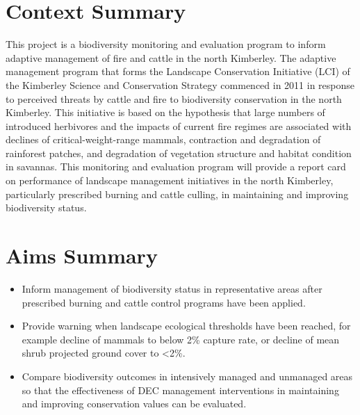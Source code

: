 \documentclass[version=last, paper=a4, DIV=18, usenames, dvipsnames]{scrartcl}
\begin{document}
\section{Context Summary}



This project is a biodiversity monitoring and evaluation program to inform adaptive management of fire and cattle in the north Kimberley. The adaptive management program that forms the Landscape Conservation Initiative (LCI) of the Kimberley Science and Conservation Strategy commenced in 2011 in response to perceived threats by cattle and fire to biodiversity conservation in the north Kimberley. This initiative is based on the hypothesis that large numbers of introduced herbivores and the impacts of current fire regimes are associated with declines of critical-weight-range mammals, contraction and degradation of rainforest patches, and degradation of vegetation structure and habitat condition in savannas. This monitoring and evaluation program will provide a report card on performance of landscape management initiatives in the north Kimberley, particularly prescribed burning and cattle culling, in maintaining and improving biodiversity status.






\section{Aims Summary}



\begin{itemize}

  \item Inform management of biodiversity status in representative areas after prescribed burning and cattle control programs have been applied.

  \item Provide warning when landscape ecological thresholds have been reached, for example decline of mammals to below 2\% capture rate, or decline of mean shrub projected ground cover to <2\%.

  \item Compare biodiversity outcomes in intensively managed and unmanaged areas so that the effectiveness of DEC management interventions in maintaining and improving conservation values can be evaluated.

\end{itemize}
\end{document}
